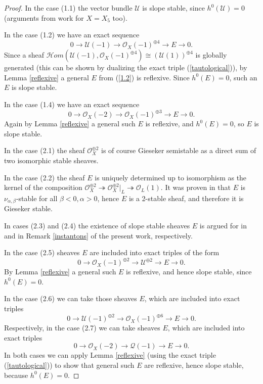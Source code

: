 \documentclass{amsart}
\begin{document}
	\begin{proof}In the case (1.1) the vector bundle $\mathcal U$ is slope stable, since $h^0(\mathcal U)=0$ (arguments from \cite[Lemma 1.2.5]{OSS} work for $X=X_5$ too).
		
	In the case (1.2) we have an exact sequence
	\begin{equation}\label{1.2}0\to\mathcal U(-1)\to\mathcal O_X(-1)^{\oplus 4}\to E\to 0.\end{equation}
	Since a sheaf $\mathcal Hom(\mathcal U(-1),\mathcal O_X(-1)^{\oplus 4})\cong(\mathcal U(1))^{\oplus 4}$ is globally generated (this can be shown by dualizing the exact triple (\ref{tautological})), by Lemma \ref{reflexive} a general $E$ from (\ref{1.2}) is reflexive. Since $h^0(E)=0$, such an $E$ is slope stable.
	
	In the case (1.4) we have an exact sequence
	$$0\to\mathcal O_X(-2)\to\mathcal O_X(-1)^{\oplus 3}\to E\to 0.$$
	Again by Lemma \ref{reflexive} a general such $E$ is reflexive, and $h^0(E)=0$, so $E$ is slope stable.
	
	In the case (2.1) the sheaf $\mathcal O_X^{\oplus 2}$ is of course Gieseker semistable as a direct sum of two isomorphic stable sheaves.
	
	In the case (2.2) the sheaf $E$ is uniquely determined up to isomorphism as the kernel of the composition $\mathcal O_X^{\oplus 2}\twoheadrightarrow\mathcal O_X^{\oplus 2}|_L\twoheadrightarrow\mathcal O_L(1)$. It was proven in \cite[Lemma 3.7]{Vass} that $E$ is $\nu_{\alpha,\beta}$-stable for all $\beta<0,\alpha>0$, hence $E$ is a 2-stable sheaf, and therefore it is Gieseker stable.
	
	In cases (2.3) and (2.4) the existence of slope stable sheaves $E$ is argued for in \cite[Remark 3.13]{Vass} and in Remark \ref{instantons} of the present work, respectively.
	
	In the case (2.5) sheaves $E$ are included into exact triples of the form
	$$0\to\mathcal O_X(-1)^{\oplus 2}\to\mathcal U^{\oplus 2}\to E\to 0.$$
	By Lemma \ref{reflexive} a general such $E$ is reflexive, and hence slope stable, since $h^0(E)=0$.	
	
	In the case (2.6) we can take those sheaves $E$, which are included into exact triples
	$$0\to\mathcal U(-1)^{\oplus 2}\to\mathcal O_X(-1)^{\oplus 6}\to E\to 0.$$
	Respectively, in the case (2.7) we can take sheaves $E$, which are included into exact triples
	$$0\to\mathcal O_X(-2)\to\mathcal Q(-1)\to E\to 0.$$
	In both cases we can apply Lemma \ref{reflexive} (using the exact triple (\ref{tautological})) to show that general such $E$ are reflexive, hence slope stable, because $h^0(E)=0$.	
\end{proof}
\end{document}
